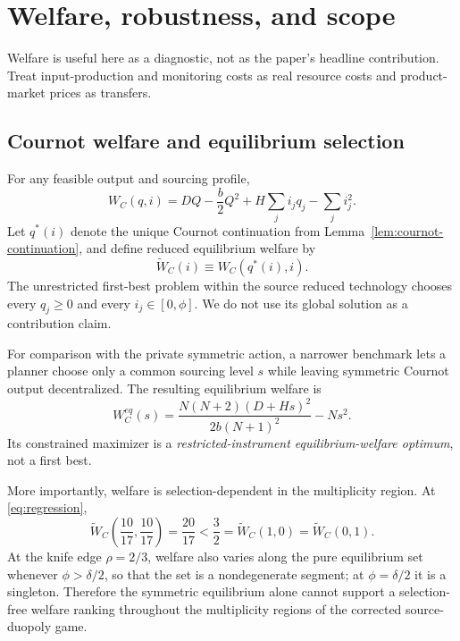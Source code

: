 \section{Welfare, robustness, and scope}
\label{sec:welfare-scope}

Welfare is useful here as a diagnostic, not as the paper's headline contribution.  Treat input-production and monitoring costs as real resource costs and product-market prices as transfers.

\subsection{Cournot welfare and equilibrium selection}

For any feasible output and sourcing profile,
\begin{equation}
W_C(q,i)
=
DQ-\frac b2Q^2
+
H\sum_j i_jq_j
-
\sum_j i_j^2.
\label{eq:WC}
\end{equation}
Let \(q^*(i)\) denote the unique Cournot continuation from Lemma~\ref{lem:cournot-continuation}, and define reduced equilibrium welfare by
\[
\widetilde W_C(i)\equiv W_C(q^*(i),i).
\]
The unrestricted first-best problem within the source reduced technology chooses every \(q_j\ge0\) and every \(i_j\in[0,\phi]\).  We do not use its global solution as a contribution claim.

For comparison with the private symmetric action, a narrower benchmark lets a planner choose only a common sourcing level \(s\) while leaving symmetric Cournot output decentralized.  The resulting equilibrium welfare is
\begin{equation}
W_C^{eq}(s)
=
\frac{N(N+2)(D+Hs)^2}{2b(N+1)^2}
-
Ns^2.
\label{eq:restricted-welfare}
\end{equation}
Its constrained maximizer is a \emph{restricted-instrument equilibrium-welfare optimum}, not a first best.

More importantly, welfare is selection-dependent in the multiplicity region.  At \eqref{eq:regression},
\begin{equation}
\widetilde W_C\left(\frac{10}{17},\frac{10}{17}\right)
=
\frac{20}{17}
<
\frac32
=
\widetilde W_C(1,0)
=
\widetilde W_C(0,1).
\label{eq:welfare-regression}
\end{equation}
At the knife edge \(\rho=2/3\), welfare also varies along the pure equilibrium set whenever \(\phi>\delta/2\), so that the set is a nondegenerate segment; at \(\phi=\delta/2\) it is a singleton.  Therefore the symmetric equilibrium alone cannot support a selection-free welfare ranking throughout the multiplicity regions of the corrected source-duopoly game.

